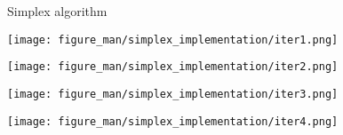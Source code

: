\documentclass[11pt,compress,t,notes=noshow, xcolor=table]{beamer}
\begin{document}
\begin{vbframe}{Simplex algorithm}
\framebreak

\begin{center}
\texttt{[image: figure\_man/simplex\_implementation/iter1.png]}
\end{center}

\framebreak

\begin{center}
\texttt{[image: figure\_man/simplex\_implementation/iter2.png]}
\end{center}

\framebreak

\begin{center}
\texttt{[image: figure\_man/simplex\_implementation/iter3.png]}
\end{center}

\framebreak

\begin{center}
\texttt{[image: figure\_man/simplex\_implementation/iter4.png]}
\end{center}

\end{vbframe}

%

\endlecture
\end{document}

